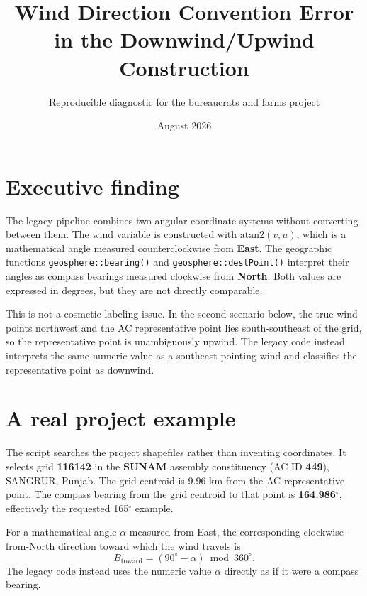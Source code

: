 \documentclass[10pt]{article}
\title{\textbf{Wind Direction Convention Error in the Downwind/Upwind Construction}}
\author{Reproducible diagnostic for the bureaucrats and farms project}
\date{August 2026}
\begin{document}
\maketitle

\section*{Executive finding}
The legacy pipeline combines two angular coordinate systems without converting
between them. The wind variable is constructed with
$\mathrm{atan2}(v,u)$, which is a mathematical angle measured
counterclockwise from \textbf{East}. The geographic functions
\texttt{geosphere::bearing()} and \texttt{geosphere::destPoint()} interpret
their angles as compass bearings measured clockwise from \textbf{North}. Both values are
expressed in degrees, but they are not directly comparable.

This is not a cosmetic labeling issue. In the second scenario below, the true
wind points northwest and the AC representative point lies south-southeast of
the grid, so the representative point is unambiguously upwind. The legacy code
instead interprets the same numeric value as a southeast-pointing wind and
classifies the representative point as downwind.

\section*{A real project example}
The script searches the project shapefiles rather than inventing coordinates.
It selects grid \textbf{116142} in the
\textbf{SUNAM} assembly constituency
(AC ID \textbf{449}), SANGRUR, Punjab. The grid centroid
is 9.96 km from the AC representative point. The compass
bearing from the grid centroid to that point is
\textbf{164.986$^\circ$}, effectively the requested
165$^\circ$ example.

For a mathematical angle $\alpha$ measured from East, the corresponding
clockwise-from-North direction toward which the wind travels is
\[
  B_{\mathrm{toward}} = (90^\circ - \alpha) \bmod 360^\circ.
\]
The legacy code instead uses the numeric value $\alpha$ directly as if it were
a compass bearing.

\begin{table}[ht]
\centering
\small
{}
\caption{Angles and classifications. A point is downwind only when its circular
angular separation from the wind-toward direction is less than 90$^\circ$.}
\end{table}
\end{document}
